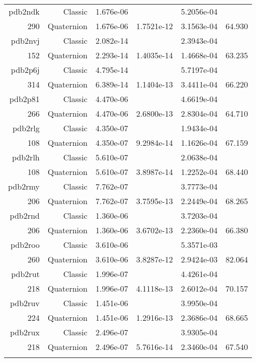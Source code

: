 \begin{xltabular}{\textwidth}{r|rS[table-format=1.3e+2]S[table-format=1.4e+2]S[table-format=1.4e+2]S[table-format=-1.3]}
pdb2ndk & Classic & 1.676e-06 &  & 5.2056e-04 & \\
290 & Quaternion & 1.676e-06 & 1.7521e-12 & 3.1563e-04 & 64.930\\  \addlinespace
pdb2nvj & Classic & 2.082e-14 &  & 2.3943e-04 & \\
152 & Quaternion & 2.293e-14 & 1.4035e-14 & 1.4668e-04 & 63.235\\  \addlinespace
pdb2p6j & Classic & 4.795e-14 &  & 5.7197e-04 & \\
314 & Quaternion & 6.389e-14 & 1.1404e-13 & 3.4411e-04 & 66.220\\  \addlinespace
pdb2p81 & Classic & 4.470e-06 &  & 4.6619e-04 & \\
266 & Quaternion & 4.470e-06 & 2.6800e-13 & 2.8304e-04 & 64.710\\  \addlinespace
pdb2rlg & Classic & 4.350e-07 &  & 1.9434e-04 & \\
108 & Quaternion & 4.350e-07 & 9.2984e-14 & 1.1626e-04 & 67.159\\  \addlinespace
pdb2rlh & Classic & 5.610e-07 &  & 2.0638e-04 & \\
108 & Quaternion & 5.610e-07 & 3.8987e-14 & 1.2252e-04 & 68.440\\  \addlinespace
pdb2rmy & Classic & 7.762e-07 &  & 3.7773e-04 & \\
206 & Quaternion & 7.762e-07 & 3.7595e-13 & 2.2449e-04 & 68.265\\  \addlinespace
pdb2rnd & Classic & 1.360e-06 &  & 3.7203e-04 & \\
206 & Quaternion & 1.360e-06 & 3.6702e-13 & 2.2360e-04 & 66.380\\  \addlinespace
pdb2roo & Classic & 3.610e-06 &  & 5.3571e-03 & \\
260 & Quaternion & 3.610e-06 & 3.8287e-12 & 2.9424e-03 & 82.064\\  \addlinespace
pdb2rut & Classic & 1.996e-07 &  & 4.4261e-04 & \\
218 & Quaternion & 1.996e-07 & 4.1118e-13 & 2.6012e-04 & 70.157\\  \addlinespace
pdb2ruv & Classic & 1.451e-06 &  & 3.9950e-04 & \\
224 & Quaternion & 1.451e-06 & 1.2916e-13 & 2.3686e-04 & 68.665\\  \addlinespace
pdb2rux & Classic & 2.496e-07 &  & 3.9305e-04 & \\
218 & Quaternion & 2.496e-07 & 5.7616e-14 & 2.3460e-04 & 67.540\\  \addlinespace

\end{xltabular}
